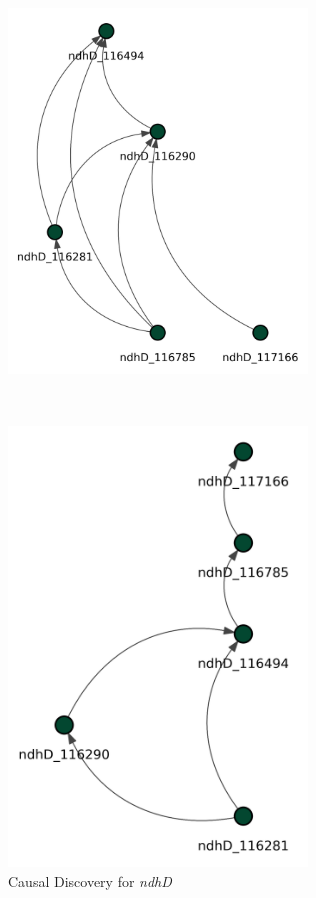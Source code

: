 \documentclass[
]{article}
\theoremstyle{definition}
\theoremstyle{remark}
\begin{document}
\begin{figure}[H]
\begin{minipage}{0.43\linewidth}
\includegraphics[width=3.125in,height=\textheight,keepaspectratio]{Figures Causal Discovery/DAG_LiNGAM_ndhD.png}

\end{minipage}%
%
\begin{minipage}{0.13\linewidth}
~\end{minipage}%
%
\begin{minipage}{0.43\linewidth}

\includegraphics[width=3.125in,height=\textheight,keepaspectratio]{Figures Causal Discovery/DAG_NOTEARS_ndhD.png}

\end{minipage}%

\caption{\label{fig-CD_ndhD}Causal Discovery for \emph{ndhD}}

\end{figure}%
\end{document}
